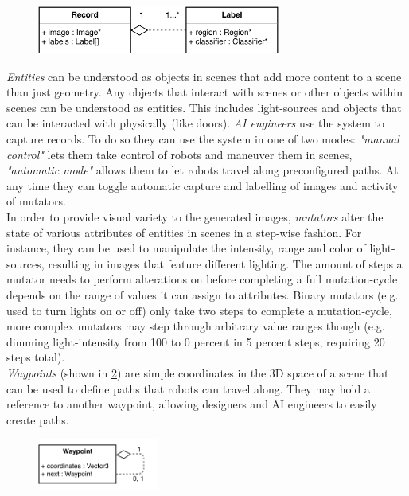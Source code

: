 \begin{figure}[b]
    \centering
    \includegraphics[width=8cm]{img/ch04/Classes_Record.pdf}
    \label{fig:classes-record}
\end{figure}
\emph{Entities} can be understood as objects in scenes that add more content to a scene than just geometry. Any objects that interact with scenes or other objects within scenes can be understood as entities. This includes light-sources and objects that can be interacted with physically (like doors).
\emph{\acs{AI} engineers} use the system to capture records. To do so they can use the system in one of two modes: \emph{"manual control"} lets them take control of robots and maneuver them in scenes, \emph{"automatic mode"} allows them to let robots travel along preconfigured paths. At any time they can toggle automatic capture and labelling of images and activity of mutators.\\
In order to provide visual variety to the generated images, \emph{mutators} alter the state of various attributes of entities in scenes in a step-wise fashion. For instance, they can be used to manipulate the intensity, range and color of light-sources, resulting in images that feature different lighting. The amount of steps a mutator needs to perform alterations on before completing a full mutation-cycle depends on the range of values it can assign to attributes. Binary mutators (e.g. used to turn lights on or off) only take two steps to complete a mutation-cycle, more complex mutators may step through arbitrary value ranges though (e.g. dimming light-intensity from 100 to 0 percent in 5 percent steps, requiring 20 steps total). \\
\emph{Waypoints} (shown in \ref{fig:classes-waypoint}) are simple coordinates in the 3D space of a scene that can be used to define paths that robots can travel along. They may hold a reference to another waypoint, allowing designers and \acs{AI} engineers to easily create paths.  
\begin{figure}[t]
    \centering
    \includegraphics[width=4cm]{img/ch04/Classes_Waypoint.pdf}
    \label{fig:classes-waypoint}
\end{figure}
